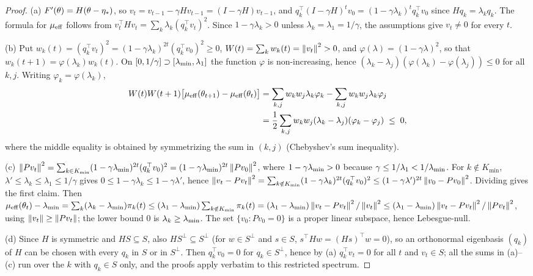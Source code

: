 \begin{proof}
(a) $F'(\theta)=H(\theta-\eta_\ast)$, so $v_t=v_{t-1}-\gamma Hv_{t-1}=(I-\gamma H)v_{t-1}$, and
$q_k^\top(I-\gamma H)^tv_0=(1-\gamma\lambda_k)^tq_k^\top v_0$ since $Hq_k=\lambda_kq_k$. The formula for
$\mu_{\mathrm{eff}}$ follows from $v_t^\top Hv_t=\sum_k\lambda_k(q_k^\top v_t)^2$. Since $1-\gamma\lambda_k>0$ unless
$\lambda_k=\lambda_1=1/\gamma$, the assumptions give $v_t\neq0$ for every $t$.

(b) Put $w_k(t)=(q_k^\top v_t)^2=(1-\gamma\lambda_k)^{2t}(q_k^\top v_0)^2\ge0$, $W(t)=\sum_kw_k(t)=\left\|v_t\right\|^2>0$, and
$\varphi(\lambda)=(1-\gamma\lambda)^2$, so that $w_k(t+1)=\varphi(\lambda_k)w_k(t)$. On $[0,1/\gamma]\supset[\lambda_{\min},\lambda_1]$
the function $\varphi$ is non-increasing, hence $(\lambda_k-\lambda_j)(\varphi(\lambda_k)-\varphi(\lambda_j))\le0$ for all
$k,j$. Writing $\varphi_k=\varphi(\lambda_k)$,
\begin{align*}
W(t)W(t+1)\big[\mu_{\mathrm{eff}}(\theta_{t+1})-\mu_{\mathrm{eff}}(\theta_t)\big]
&=\sum_{k,j}w_kw_j\lambda_k\varphi_k-\sum_{k,j}w_kw_j\lambda_k\varphi_j\\
&=\frac12\sum_{k,j}w_kw_j(\lambda_k-\lambda_j)(\varphi_k-\varphi_j)\;\le\;0,
\end{align*}
where the middle equality is obtained by symmetrizing the sum in $(k,j)$ (Chebyshev's sum inequality).

(c) $\left\|Pv_t\right\|^2=\sum_{k\in K_{\min}}(1-\gamma\lambda_{\min})^{2t}(q_k^\top v_0)^2=(1-\gamma\lambda_{\min})^{2t}\left\|Pv_0\right\|^2$, where
$1-\gamma\lambda_{\min}>0$ because $\gamma\le1/\lambda_1<1/\lambda_{\min}$. For $k\notin K_{\min}$, $\lambda'\le\lambda_k\le\lambda_1\le1/\gamma$
gives $0\le1-\gamma\lambda_k\le1-\gamma\lambda'$, hence
$\left\|v_t-Pv_t\right\|^2=\sum_{k\notin K_{\min}}(1-\gamma\lambda_k)^{2t}(q_k^\top v_0)^2\le(1-\gamma\lambda')^{2t}\left\|v_0-Pv_0\right\|^2$.
Dividing gives the first claim. Then
$\mu_{\mathrm{eff}}(\theta_t)-\lambda_{\min}=\sum_k(\lambda_k-\lambda_{\min})\pi_k(t)\le(\lambda_1-\lambda_{\min})\sum_{k\notin K_{\min}}\pi_k(t)
=(\lambda_1-\lambda_{\min})\left\|v_t-Pv_t\right\|^2/\left\|v_t\right\|^2\le(\lambda_1-\lambda_{\min})\left\|v_t-Pv_t\right\|^2/\left\|Pv_t\right\|^2$,
using $\left\|v_t\right\|\ge\left\|Pv_t\right\|$; the lower bound $0$ is $\lambda_k\ge\lambda_{\min}$. The set $\{v_0:Pv_0=0\}$ is a
proper linear subspace, hence Lebesgue-null.

(d) Since $H$ is symmetric and $HS\subseteq S$, also $HS^\perp\subseteq S^\perp$ (for $w\in S^\perp$ and $s\in S$,
$s^\top Hw=(Hs)^\top w=0$), so an orthonormal eigenbasis $(q_k)$ of $H$ can be chosen with every $q_k$ in $S$ or in
$S^\perp$. Then $q_k^\top v_0=0$ for $q_k\in S^\perp$, hence by (a) $q_k^\top v_t=0$ for all $t$ and $v_t\in S$; all the
sums in (a)--(c) run over the $k$ with $q_k\in S$ only, and the proofs apply verbatim to this restricted spectrum.
\end{proof}

